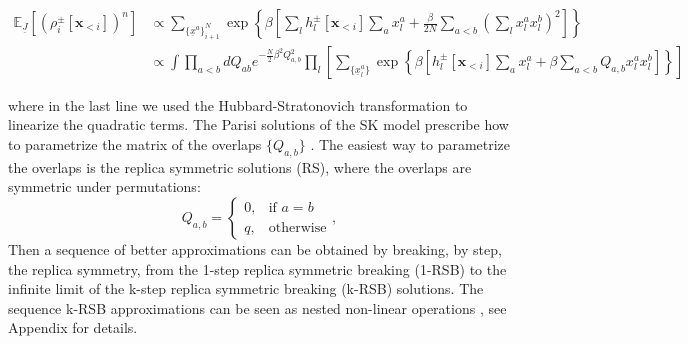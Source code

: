 \documentclass[aps,physrev,10pt,floatfix,reprint]{revtex4-2}
\begin{document}
\begin{widetext}
\begin{align}
\mathbb{E}_{\underline{J}}\left[(\rho_i^{\pm}[\mathbf{x}_{<i}])^n \right]
& \propto  
\sum_{\{\underline{x}^{a}\}_{i+1}^N} 
\exp\left\{\beta \left[
\sum_{l} h_l^{\pm}[\mathbf{x}_{<i}] \sum_{a} x_l^{a} +\frac{\beta}{2N} \sum_{a<b} \left( \sum_{l}  x_l^{a} x_l^{b} \right)^2 \right]  \right\}\\
& \propto  \int \prod_{a<b} dQ_{ab} e^{-\frac{N}{2}\beta^2Q_{a,b}^2}
\prod_{l} \left[
\sum_{\{\underline{x}^{a}_l\}} 
\exp\left\{\beta \left[
h_l^{\pm}[\mathbf{x}_{<i}] \sum_{a} x_l^{a} +\beta \sum_{a<b} Q_{a,b}  x_l^{a} x_l^{b} \right]  \right\}
\right]
\end{align}
\end{widetext}
where in the last line we used the Hubbard-Stratonovich transformation to linearize the quadratic terms. 
The Parisi solutions of the SK model prescribe how to parametrize the matrix of the overlaps $\{Q_{a,b}\}$ \cite{10.1142/0271}. The easiest way to parametrize the overlaps is the replica symmetric solutions (RS), where the overlaps are symmetric under permutations: 
$$
Q_{a,b}=\begin{cases}
			0, & \text{if $a=b$}\\
            q, & \text{otherwise}
		 \end{cases},
$$
Then a sequence of better approximations can be obtained by breaking, by step, the replica symmetry, from the 1-step replica symmetric breaking (1-RSB) to the infinite limit of the k-step replica symmetric breaking (k-RSB) solutions. 
The sequence k-RSB approximations can be seen as nested non-linear operations \cite{Parisi_1980}, see Appendix for details. 
\end{document}
